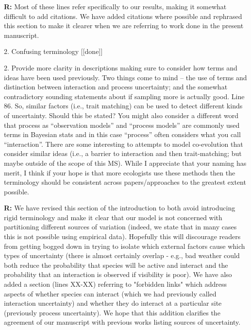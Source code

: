 \documentclass[12pt]{letter}
\newenvironment{refquote}{\bigskip \begin{it}}{\end{it}\smallskip}
\begin{document}
		\textbf{R:} Most of these lines refer specifically to our results, making it somewhat difficult to add citations. We have added citations where possible and rephrased this section to make it clearer when we are referring to work done in the present manuscript.


	2. Confusing terminology [[done]]

		\begin{refquote}
		2.      Provide more clarity in descriptions making sure to consider how terms and ideas have been used previously.  Two things come to mind – the use of terms and distinction between interaction and process uncertainty; and the somewhat contradictory sounding statements about if sampling more is actually good.
		\medskip
		Line 86.  So, similar factors (i.e., trait matching) can be used to detect different kinds of uncertainty.  Should this be stated?  You might also consider a different word that process as “observation models” and “process models” are commonly used terms in Bayesian stats and in this case “process” often considers what you call “interaction”.  There are some interesting to attempts to model co-evolution that consider similar ideas (i.e., a barrier to interaction and then trait-matching; but maybe outside of the scope of this MS). While I appreciate that your naming has merit, I think if your hope is that more ecologists use these methods then the terminology should be consistent across papers/approaches to the greatest extent possible.
		\end{refquote}


		\textbf{R:} We have revised this section of the introduction to both avoid introducing rigid terminology and make it clear that our model is not concerned with partitioning different sources of variation (indeed, we state that in many cases this is not possible using empirical data). Hopefully this will discourage readers from getting bogged down in trying to isolate which external factors cause which types of uncertainty (there is almost certainly overlap - e.g., bad weather could both reduce the probability that species will be active and interact and the probability that an interaction is observed if visibility is poor). We have also added a section (lines XX-XX) referring to "forbidden links" which address aspects of whether species can interact (which we had previously called interaction uncertainty) and whether they do interact at a particular site (previously process uncertainty). We hope that this addition clarifies the agreement of our manuscript with previous works listing sources of uncertainty.
\end{document}
